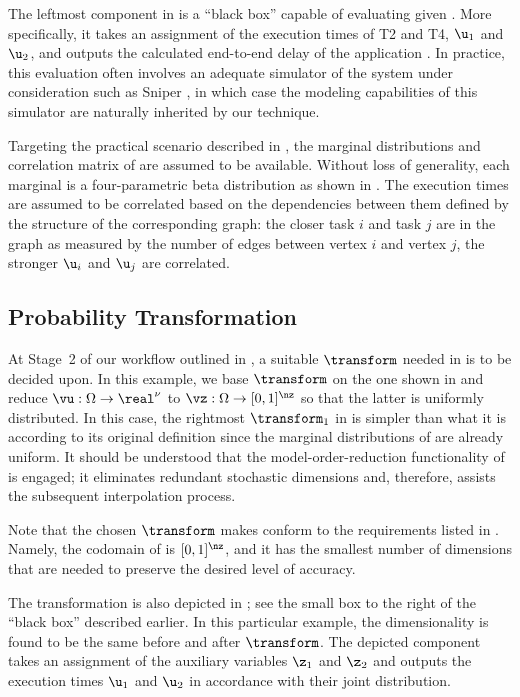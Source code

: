 The leftmost component in  is a ``black box''
capable of evaluating \g given \vu. More specifically, it takes an assignment of
the execution times of T2 and T4, $\u_1$ and $\u_2$, and outputs the calculated
end-to-end delay of the application \g. In practice, this evaluation often
involves an adequate simulator of the system under consideration such as Sniper
\cite{carlson2011}, in which case the modeling capabilities of this simulator
are naturally inherited by our technique.

Targeting the practical scenario described in , the
marginal distributions and correlation matrix of \vu are assumed to be
available. Without loss of generality, each marginal is a four-parametric beta
distribution as shown in . The execution times are
assumed to be correlated based on the dependencies between them defined by the
structure of the corresponding graph: the closer task $i$ and task $j$ are in
the graph as measured by the number of edges between vertex $i$ and vertex $j$,
the stronger $\u_i$ and $\u_j$ are correlated.

\subsection{Probability Transformation}

At Stage~2 of our workflow outlined in , a suitable
$\transform$ needed in  is to be decided upon.
In this example, we base $\transform$ on the one shown in
 and reduce $\vu: \Omega \to \real^\nu$ to
$\vz: \Omega \to [0, 1]^\nz$ so that the latter is uniformly distributed. In
this case, the rightmost $\transform_1$ in  is
simpler than what it is according to its original definition since the marginal
distributions of \vz are already uniform. It should be understood that the
model-order-reduction functionality of  is
engaged; it eliminates redundant stochastic dimensions and, therefore, assists
the subsequent interpolation process.

Note that the chosen $\transform$ makes \vz conform to the requirements listed
in . Namely, the codomain of \vz is $[0,
1]^\nz$, and it has the smallest number of dimensions that are needed to
preserve the desired level of accuracy.

The transformation is also depicted in ; see the
small box to the right of the ``black box'' described earlier. In this
particular example, the dimensionality is found to be the same before and after
$\transform$. The depicted component takes an assignment of the auxiliary
variables $\z_1$ and $\z_2$ and outputs the execution times $\u_1$ and $\u_2$ in
accordance with their joint distribution.


